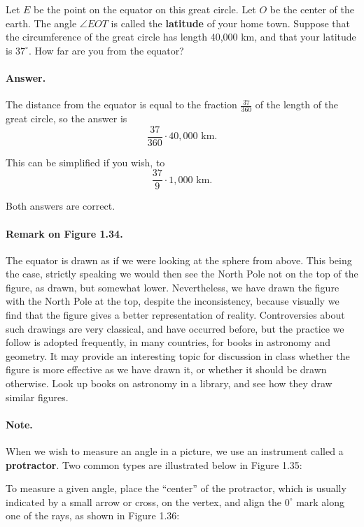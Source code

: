 \documentclass[12pt]{book} %
\begin{document}

Let $E$ be the point on the equator on this great circle. Let $O$ be the center of the earth. The angle $\angle EOT$ is called the \textbf{latitude} of your home town. Suppose that the circumference of the great circle has length 40,000 km, and that your latitude is $37^\circ$. How far are you from the equator?

\paragraph{Answer.}
The distance from the equator is equal to the fraction $\frac{37}{360}$ of the length of the great circle, so the answer is
\[
\frac{37}{360}\cdot 40{,}000\text{ km}.
\]

This can be simplified if you wish, to
\[
\frac{37}{9}\cdot 1{,}000\text{ km}.
\]

Both answers are correct.

\paragraph{Remark on Figure 1.34.}
The equator is drawn as if we were looking at the sphere from above. This being the case, strictly speaking we would then see the North Pole not on the top of the figure, as drawn, but somewhat lower. Nevertheless, we have drawn the figure with the North Pole at the top, despite the inconsistency, because visually we find that the figure gives a better representation of reality. Controversies about such drawings are very classical, and have occurred before, but the practice we follow is adopted frequently, in many countries, for books in astronomy and geometry. It may provide an interesting topic for discussion in class whether the figure is more effective as we have drawn it, or whether it should be drawn otherwise. Look up books on astronomy in a library, and see how they draw similar figures.

\paragraph{Note.}
When we wish to measure an angle in a picture, we use an instrument called a \textbf{protractor}. Two common types are illustrated below in Figure 1.35:


To measure a given angle, place the ``center'' of the protractor, which is usually indicated by a small arrow or cross, on the vertex, and align the $0^\circ$ mark along one of the rays, as shown in Figure 1.36:
\end{document}
